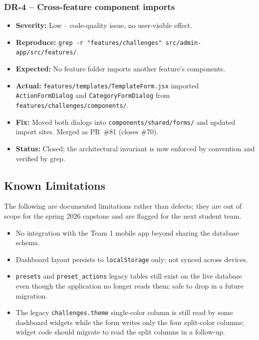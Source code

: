\documentclass[11pt,letterpaper]{article}
\begin{document}
\subsubsection*{DR-4 -- Cross-feature component imports}

\begin{itemize}[noitemsep]
  \item \textbf{Severity:} Low -- code-quality issue, no
        user-visible effect.
  \item \textbf{Reproduce:} \texttt{grep -r "features/challenges" src/admin-app/src/features/}.
  \item \textbf{Expected:} No feature folder imports another
        feature's components.
  \item \textbf{Actual:} \texttt{features/templates/TemplateForm.jsx}
        imported \texttt{ActionFormDialog} and
        \texttt{CategoryFormDialog} from
        \texttt{features/challenges/components/}.
  \item \textbf{Fix:} Moved both dialogs into
        \texttt{components/shared/forms/} and updated import
        sites. Merged as PR~\#81 (closes \#70).
  \item \textbf{Status:} Closed; the architectural invariant
        is now enforced by convention and verified by grep.
\end{itemize}

\subsection{Known Limitations}

The following are documented limitations rather than defects;
they are out of scope for the spring 2026 capstone and are
flagged for the next student team.

\begin{itemize}[noitemsep]
  \item No integration with the Team 1 mobile app beyond
        sharing the database schema.
  \item Dashboard layout persists to \texttt{localStorage}
        only; not synced across devices.
  \item \texttt{presets} and \texttt{preset\_actions} legacy
        tables still exist on the live database even though
        the application no longer reads them; safe to drop in
        a future migration.
  \item The legacy \texttt{challenges.theme} single-color
        column is still read by some dashboard widgets while
        the form writes only the four split-color columns;
        widget code should migrate to read the split columns
        in a follow-up.
\end{itemize}
\end{document}
